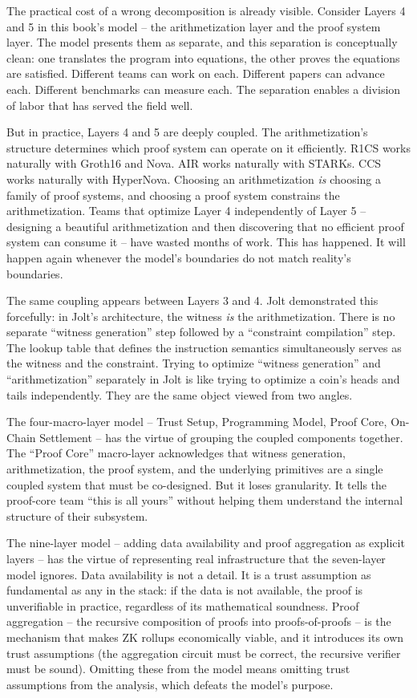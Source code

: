\documentclass[
  11pt,
  openany]{report}
\begin{document}
The practical cost of a wrong decomposition is already visible. Consider Layers
4 and 5 in this book's model -- the arithmetization layer and the proof system
layer. The model presents them as separate, and this separation is conceptually
clean: one translates the program into equations, the other proves the equations
are satisfied. Different teams can work on each. Different papers can advance
each. Different benchmarks can measure each. The separation enables a division
of labor that has served the field well.

But in practice, Layers 4 and 5 are deeply coupled. The arithmetization's
structure determines which proof system can operate on it efficiently. R1CS
works naturally with Groth16 and Nova. AIR works naturally with STARKs. CCS
works naturally with HyperNova. Choosing an arithmetization \emph{is} choosing a
family of proof systems, and choosing a proof system constrains the
arithmetization. Teams that optimize Layer 4 independently of Layer 5 --
designing a beautiful arithmetization and then discovering that no efficient
proof system can consume it -- have wasted months of work. This has happened. It
will happen again whenever the model's boundaries do not match reality's
boundaries.

The same coupling appears between Layers 3 and 4. Jolt demonstrated this
forcefully: in Jolt's architecture, the witness \emph{is} the arithmetization.
There is no separate ``witness generation'' step followed by a ``constraint
compilation'' step. The lookup table that defines the instruction semantics
simultaneously serves as the witness and the constraint. Trying to optimize
``witness generation'' and ``arithmetization'' separately in Jolt is like trying
to optimize a coin's heads and tails independently. They are the same object
viewed from two angles.

The four-macro-layer model -- Trust Setup, Programming Model, Proof Core,
On-Chain Settlement -- has the virtue of grouping the coupled components
together. The ``Proof Core'' macro-layer acknowledges that witness generation,
arithmetization, the proof system, and the underlying primitives are a single
coupled system that must be co-designed. But it loses granularity. It tells the
proof-core team ``this is all yours'' without helping them understand the
internal structure of their subsystem.

The nine-layer model -- adding data availability and proof aggregation as
explicit layers -- has the virtue of representing real infrastructure that the
seven-layer model ignores. Data availability is not a detail. It is a trust
assumption as fundamental as any in the stack: if the data is not available, the
proof is unverifiable in practice, regardless of its mathematical soundness.
Proof aggregation -- the recursive composition of proofs into proofs-of-proofs
-- is the mechanism that makes ZK rollups economically viable, and it introduces
its own trust assumptions (the aggregation circuit must be correct, the
recursive verifier must be sound). Omitting these from the model means omitting
trust assumptions from the analysis, which defeats the model's purpose.
\end{document}
